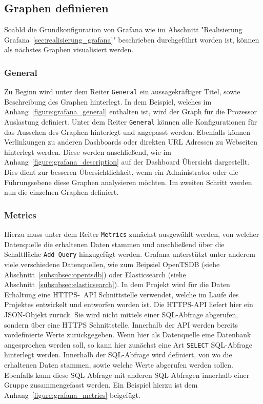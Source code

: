 {\subsection{Graphen definieren}
\label{subsec:graphen-definieren}
Soabld die Grundkonfiguration von Grafana wie im Abschnitt "Realisierung
Grafana~\ref{sec:realisierung_grafana}" beschrieben durchgeführt worden ist,
können als nächstes Graphen visualisiert werden.
\mr%

\subsubsection{General}
Zu Beginn wird unter dem Reiter \texttt{General} ein aussagekräftiger Titel,
sowie Beschreibung des Graphen hinterlegt. In dem Beispiel, welches im
Anhang~\ref{figure:grafana_general} enthalten ist, wird der Graph für die
Prozessor Auslastung definiert. Unter dem Reiter \texttt{General} können alle
Konfigurationen für das Aussehen des Graphen hinterlegt und angepasst werden.
Ebenfalls können Verlinkungen zu anderen Dashboards oder direkten URL Adressen
zu Webseiten hinterlegt werden. Diese werden anschließend, wie im
Anhang~\ref{figure:grafana_description} auf der Dashboard Übersicht
dargestellt. Dies dient zur besseren Übersichtlichkeit, wenn ein Administrator
oder die Führungsebene diese Graphen analysieren möchten. Im zweiten Schritt
werden nun die einzelnen Graphen definiert.
\mr%

\subsubsection{Metrics}
Hierzu muss unter dem Reiter \texttt{Metrics} zunächst ausgewählt werden, von
welcher Datenquelle die erhaltenen Daten stammen und anschließend über die
Schaltfläche \texttt{Add Query} hinzugefügt werden. Grafana unterstützt unter
anderem viele verschiedene Datenquellen, wie zum Beipsiel OpenTSDB (siehe
Abschnitt~\ref{subsubsec:opentsdb}) oder Elasticsearch (siehe
Abschnitt~\ref{subsubsec:elasticsearch}). In dem Projekt wird für die Daten
Erhaltung eine HTTPS-~\gls{API} Schnittstelle verwendet, welche im Laufe des
Projektes entwickelt und entworfen worden ist. Die HTTPS-API liefert hier ein
\gls{JSON}-Objekt zurück. Sie wird nicht mittels einer SQL-Abfrage abgerufen,
sondern über eine \gls{HTTPS} Schnittstelle. Innerhalb der API werden bereits
vordefinierte Werte zurückgegeben. Wenn hier als Datenquelle eine Datenbank
angesprochen werden soll, so kann hier zunächst eine Art \texttt{SELECT}
\gls{SQL}-Abfrage hinterlegt werden. Innerhalb der SQL-Abfrage wird definiert,
von wo die erhaltenen Daten stammen, sowie welche Werte abgerufen werden
sollen. Ebenfalls kann diese SQL Abfrage mit anderen SQL Abfragen innerhalb
einer Gruppe zusammengefasst werden. Ein Beispiel hierzu ist dem
Anhang~\ref{figure:grafana_metrics} beigefügt.
\mr%

}
